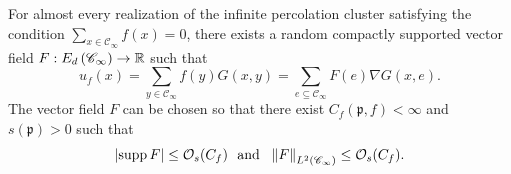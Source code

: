 \documentclass[12pt]{amsart}
\numberwithin{equation}{section}
\begin{document}
	\begin{lemma} \label{lemma:mean-zero-representation}
		For almost every realization of the infinite percolation cluster satisfying the condition $\sum_{x \in \mathscr{C}_{\infty}} f(x) = 0$, there exists a random compactly supported vector field $F : E_d \left( \mathscr{C}_\infty \right) \to \operatorname{\mathbb{R}}$
		such that
		\begin{equation} \label{eq:gradient-representation}
			u_f (x) = \sum_{y \in \mathscr{C}_\infty} f(y) G(x , y)  = \sum_{e \subseteq \mathscr{C}_\infty} F(e) \nabla G(x, e).
		\end{equation}
		The vector field $F$ can be chosen so that there exist $C_f(\mathfrak{p} , f) < \infty$ and $s(\mathfrak{p} ) > 0 $ such that
		\begin{equation} \label{eq:estimates-on-F}
			\left| \mathrm{supp\,} F\right| \leq \mathcal{O}_s (C_f) ~~\mbox{and} ~~ \left\| F \right\|_{L^2(\mathscr{C}_\infty)}  \leq \mathcal{O}_s (C_f).
		\end{equation}
	\end{lemma}
	
\end{document}
